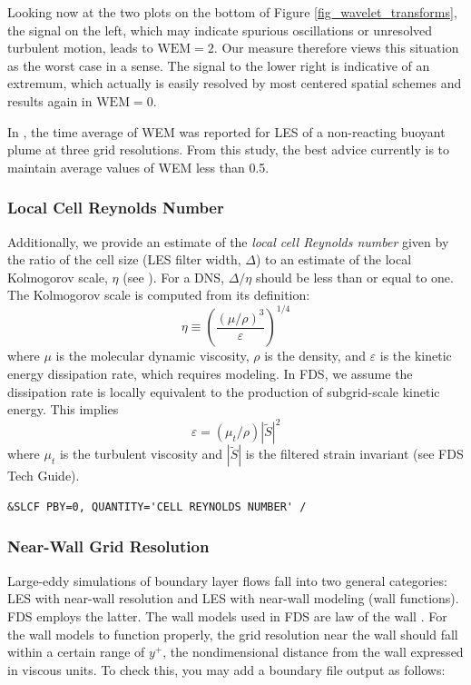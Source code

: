 \documentclass[11pt]{book}
\begin{document}
Looking now at the two plots on the bottom of Figure \ref{fig_wavelet_transforms}, the signal on the left, which may indicate spurious oscillations or unresolved turbulent motion, leads to $\mbox{WEM} = 2$.  Our measure therefore views this situation as the worst case in a sense.  The signal to the lower right is indicative of an extremum, which actually is easily resolved by most centered spatial schemes and results again in $\mbox{WEM}=0$.

In \cite{McDermott:2010}, the time average of WEM was reported for LES of a non-reacting buoyant plume at three grid resolutions.  From this study, the best advice currently is to maintain average values of WEM less than 0.5.

\subsubsection{Local Cell Reynolds Number}

Additionally, we provide an estimate of the \emph{local cell Reynolds number} given by the ratio of the cell size (LES filter width, $\Delta$) to an estimate of the local Kolmogorov scale, $\eta$ (see \cite{Pope:2000}).  For a DNS, $\Delta/\eta$ should be less than or equal to one. The Kolmogorov scale is computed from its definition:
\begin{equation}
\eta \equiv \left(\frac{(\mu/\rho)^3}{\varepsilon}\right)^{1/4}
\end{equation}
where $\mu$ is the molecular dynamic viscosity, $\rho$ is the density, and $\varepsilon$ is the kinetic energy dissipation rate, which requires modeling.  In FDS, we assume the dissipation rate is locally equivalent to the production of subgrid-scale kinetic energy.  This implies
\begin{equation}
\varepsilon = (\mu_t/\rho)|\tilde{S}|^2
\end{equation}
where $\mu_t$ is the turbulent viscosity and $|\tilde{S}|$ is the filtered strain invariant (see FDS Tech Guide).

\begin{lstlisting}
&SLCF PBY=0, QUANTITY='CELL REYNOLDS NUMBER' /
\end{lstlisting}

\subsubsection{Near-Wall Grid Resolution}
\label{info:yplus}

Large-eddy simulations of boundary layer flows fall into two general categories: LES with near-wall resolution and LES with near-wall modeling (wall functions).  FDS employs the latter.  The wall models used in FDS are law of the wall \cite{Pope:2000}.  For the wall models to function properly, the grid resolution near the wall should fall within a certain range of $y^+$, the nondimensional distance from the wall expressed in viscous units.  To check this, you may add a boundary file output as follows:
\end{document}
